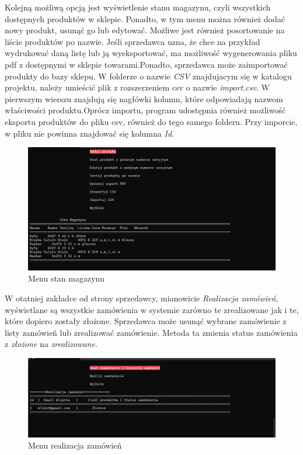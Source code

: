 Kolejną możliwą opcją jest wyświetlenie stanu magazynu, czyli wszystkich dostępnych produktów w sklepie. Ponadto, w tym menu można również dodać nowy produkt, usunąć go lub edytować. Możliwe jest również posortowanie na liście produktów po nazwie. Jeśli sprzedawca uzna, że chce na przykład wydrukować daną listę lub ją wyeksportować, ma możliwość wygenerowania pliku pdf z dostępnymi w sklepie towarami.\newline Ponadto, sprzedawca może zaimportować produkty do bazy sklepu. W folderze o nazwie \textit{CSV} znajdujacym się w katalogu projektu, należy umieścić plik z rozszerzeniem csv o nazwie \textit{import.csv}. W pierwszym wierszu znajdują się nagłówki kolumn, które odpowiadają nazwom właściwości produktu.\newline Oprócz importu, program udostępnia również możliwość eksportu produktów do pliku csv, również do tego samego folderu. Przy imporcie, w pliku nie powinna znajdować się kolumna \textit{Id}.

\begin{figure}[H]
	\centering
		\includegraphics[width=15cm]{screeny/lista_produktow_sprz.png}
	\caption{\footnotesize Menu stan magazynu}
	\label{fig:plotend}
\end{figure}

W otatniej zakładce od strony sprzedawcy, mianowicie \textit{Realizacja zamówień}, wyświetlane są wszystkie zamówienia w systemie zarówno te zrealizowane jak i te, które dopiero zostały złożone. Sprzedawca może usunąć wybrane zamówienie z listy zamówień lub zrealizować zamówienie. Metoda ta zmienia status zamówienia z \textit{złożone} na \textit{zrealizowane}.

\begin{figure}[H]
	\centering
		\includegraphics[width=15cm]{screeny/zamowienia_sprzedawca.png}
	\caption{\footnotesize Menu realizacja zamówień}
	\label{fig:plotend}
\end{figure}

